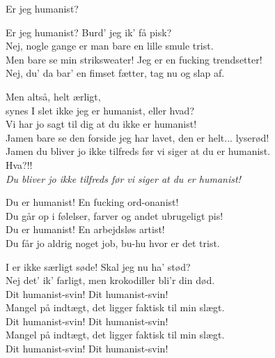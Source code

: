 \begin{song}{Er jeg humanist?}
  \begin{SBChorus}
    Er jeg humanist? Burd' jeg ik' få pisk?\\
    Nej, nogle gange er man bare en lille smule trist.\\
    Men bare se min striksweater! Jeg er en fucking trendsetter!\\
    Nej, du' da bar' en fimset fætter, tag nu og slap af.\\
  \end{SBChorus}

  \begin{SBSection*}
    Men altså, helt ærligt,\\
    synes I slet ikke jeg er humanist, eller hvad?\\
    Vi har jo sagt til dig at du ikke er humanist!\\
    Jamen bare se den forside jeg har lavet, den er helt... lyserød!\\
    Jamen du bliver jo ikke tilfreds før vi siger at du er humanist.\\
    Hva?!!\\
    \emph{Du bliver jo ikke tilfreds før vi siger at du er humanist!}
  \end{SBSection*}

  \begin{SBChorus}
    Du er humanist! En fucking ord-onanist!\\
    Du går op i følelser, farver og andet ubrugeligt pis!\\
    Du er humanist! En arbejdsløs artist!\\
    Du får jo aldrig noget job, bu-hu hvor er det trist.
  \end{SBChorus}

  \begin{SBChorus}
    I er ikke særligt søde! Skal jeg nu ha' stød?\\
    Nej det' ik' farligt, men krokodiller bli'r din død.\\
    Dit humanist-svin! Dit humanist-svin!\\
    Mangel på indtægt, det ligger faktisk til min slægt.\\
    Dit humanist-svin! Dit humanist-svin!\\
    Mangel på indtægt, det ligger faktisk til min slægt.\\
    Dit humanist-svin! Dit humanist-svin!
  \end{SBChorus}
\end{song}












